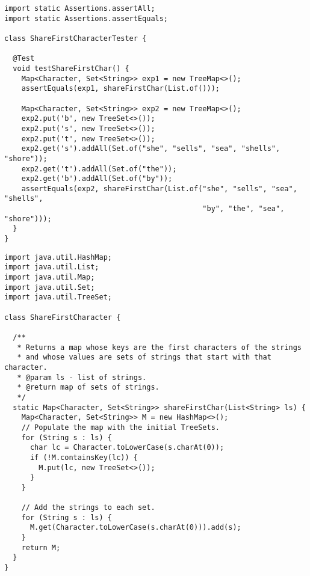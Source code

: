 \begin{cl}[]{}
\begin{lstlisting}[language=MyJava]
import static Assertions.assertAll;
import static Assertions.assertEquals;

class ShareFirstCharacterTester {
  
  @Test
  void testShareFirstChar() {
    Map<Character, Set<String>> exp1 = new TreeMap<>();
    assertEquals(exp1, shareFirstChar(List.of()));

    Map<Character, Set<String>> exp2 = new TreeMap<>();
    exp2.put('b', new TreeSet<>());
    exp2.put('s', new TreeSet<>());
    exp2.put('t', new TreeSet<>());
    exp2.get('s').addAll(Set.of("she", "sells", "sea", "shells", "shore"));
    exp2.get('t').addAll(Set.of("the"));
    exp2.get('b').addAll(Set.of("by"));
    assertEquals(exp2, shareFirstChar(List.of("she", "sells", "sea", "shells", 
                                              "by", "the", "sea", "shore")));
  }
}
\end{lstlisting}
\end{cl}

\begin{cl}[]{}
\begin{lstlisting}[language=MyJava]
import java.util.HashMap;
import java.util.List;
import java.util.Map;
import java.util.Set;
import java.util.TreeSet;

class ShareFirstCharacter {

  /**
   * Returns a map whose keys are the first characters of the strings
   * and whose values are sets of strings that start with that character.
   * @param ls - list of strings.
   * @return map of sets of strings.
   */
  static Map<Character, Set<String>> shareFirstChar(List<String> ls) {
    Map<Character, Set<String>> M = new HashMap<>();
    // Populate the map with the initial TreeSets.
    for (String s : ls) {
      char lc = Character.toLowerCase(s.charAt(0));
      if (!M.containsKey(lc)) {
        M.put(lc, new TreeSet<>());
      }
    }

    // Add the strings to each set.
    for (String s : ls) {
      M.get(Character.toLowerCase(s.charAt(0))).add(s);
    }
    return M;
  }
}
\end{lstlisting}
\end{cl}


